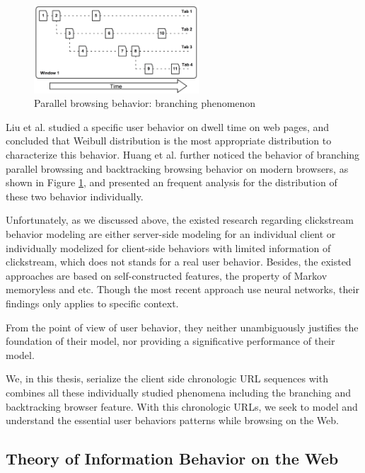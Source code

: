 \begin{figure}[H]
    \centering
    \includegraphics[width=0.55\textwidth]{figures/branching-and-backtracking}
    \caption{Parallel browsing behavior: branching phenomenon \cite{huang2010parallel}}
    \label{fig:backtrace}
\end{figure}

Liu et al. \cite{liu2010understanding} studied a specific user behavior on dwell time on web pages, and concluded that
Weibull distribution is the most appropriate distribution to characterize this behavior. 
Huang et al. \cite{huang2010parallel, huang2012no} further 
noticed the behavior of branching parallel browssing and backtracking browsing
behavior on modern browsers, as shown in Figure \ref{fig:backtrace}, 
and presented an frequent analysis for the distribution of these two behavior individually.

Unfortunately, as we discussed above, the existed research regarding clickstream 
behavior modeling are either server-side modeling for an individual client or 
individually modelized for client-side behaviors with limited information of clickstream,
which does not stands for a real user behavior. 
Besides, the existed approaches are based on self-constructed features, 
the property of Markov memoryless and etc. Though the most recent
approach use neural networks, their findings only applies to specific context.

From the point of view of user behavior, they 
neither unambiguously justifies the foundation of their model, 
nor providing a significative performance of their model.

We, in this thesis, serialize the client side chronologic URL sequences with combines all 
these individually studied phenomena including the branching and backtracking browser 
feature. With this chronologic URLs, we seek to model and understand the essential user 
behaviors patterns while browsing on the Web.

\subsection{Theory of Information Behavior on the Web}
\label{sec:info-seek}

